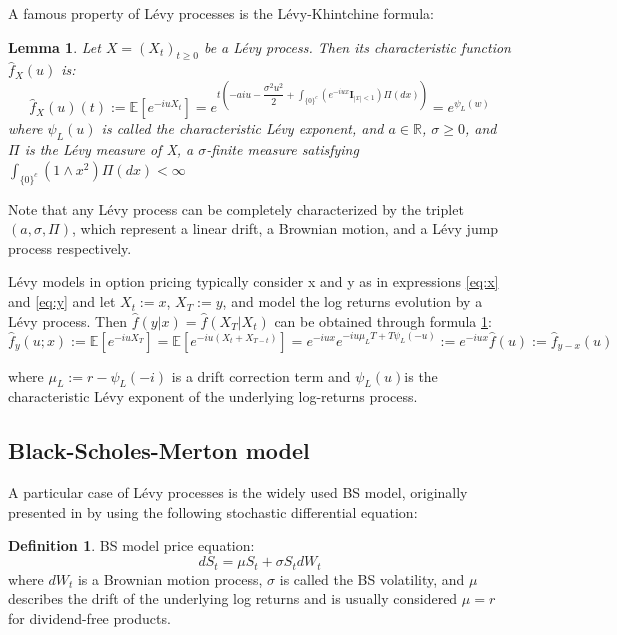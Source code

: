 \documentclass[12,twoside]{mammeTFM}
\newtheorem{lem}[thm]{Lemma}
\theoremstyle{definition}
\newtheorem{definition}[thm]{Definition}
\theoremstyle{remark}
\newcommand{\E}{\ensuremath{\mathbb{E}}}
\newcommand{\R}{\ensuremath{\mathbb{R}}}
\begin{document}
A famous property of L\'evy processes is the L\'evy-Khintchine formula:
\begin{lem}\label{levy_khin} Let $X = (X_t)_{t\geq 0}$ be a L\'evy process. Then its characteristic function $\hat{f}_X(u)$ is:
$$
\hat{f}_X(u)(t) := \E \left[e^{-i u X_t}\right] = e^{t\left(-aiu - \dfrac{\sigma^2 u^2}{2} + \int_{\{0\}^c}(e^{-iu x} \textbf{I}_{|x| < 1})\Pi(dx)\right)} = e^{\psi_L(w)}
$$
where $\psi_L(u)$ is called the characteristic L\'evy exponent, and $a \in \R$, $\sigma \geq 0$, and $\Pi$ is the L\'evy measure of X, a $\sigma$-finite measure satisfying $\int_{\{0\} ^c}(1 \wedge x^2)\Pi (dx) < \infty$
\end{lem}

Note that any L\'evy process can be completely characterized by the triplet $(a, \sigma, \Pi)$, which represent a linear drift, a Brownian motion, and a L\'evy jump process respectively.

L\'evy models in option pricing typically consider x and y as in expressions \ref{eq:x} and \ref{eq:y} and let $X_t := x$, $X_T := y$, and model the log returns evolution by a L\'evy process. Then $\hat{f}(y|x) = \hat{f}(X_T|X_t)$ can be obtained through formula \ref{levy_khin}:
\begin{equation}\label{eq:levy_char}
\hat{f}_{y}(u; x) := 
\E\left[e^{-iu X_T}\right] = 
\E\left[e^{-iu (X_t + X_{T-t})}\right] = 
e^{-iu x}e^{-i u \mu_L T + T \psi_L(-u)} := 
e^{-iu x}\hat{f}(u) := 
\hat{f}_{y - x}(u)
\end{equation}

where $\mu_L:= r - \psi_L(-i)$ is a drift correction term and $\psi_L(u)$is the characteristic L\'evy exponent of the underlying log-returns process.

\subsection{Black-Scholes-Merton model} \label{subsec:bs}

A particular case of L\'evy processes is the widely used BS model, originally presented in \cite{bs73} by using the following stochastic differential equation:
\begin{definition} BS model price equation:
\begin{equation}
dS_t = \mu S_t + \sigma S_t dW_t
\end{equation}
where $dW_t$ is a Brownian motion process, $\sigma$ is called the BS volatility, and $\mu$ describes the drift of the underlying log returns and is usually considered $\mu = r$ for dividend-free products.
\end{definition}
\end{document}
